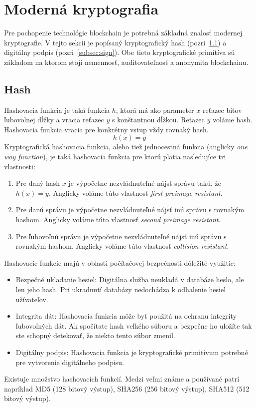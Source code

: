 \section{Moderná kryptografia}\label{sec:crypto}
Pre pochopenie technológie blockchain je potrebná základná znalosť modernej kryptografie. V tejto sekcii je popísaný kryptografický hash (pozri~\ref{subsec:hash}) a digitálny podpis (pozri~\ref{subsec:sign}). Obe tieto kryptografické primitíva sú základom na ktorom stojí nemennosť, auditovateľnosť a anonymita blockchainu.

\subsection{Hash}\label{subsec:hash}
Hashovacia funkcia je taká funkcia $h$, ktorá má ako parameter $x$ reťazec bitov ľubovolnej dĺžky a vracia reťazec $y$ s konštantnou dĺžkou. Reťazec $y$ voláme hash. Hashovacia funkcia vracia pre konkrétny vstup vždy rovnaký hash.
$$ h(x) = y $$
Kryptografická hashovacia funkcia, alebo tiež jednocestná funkcia (anglicky \textit{one way function}), je taká hashovacia funkcia pre ktorú platia nasledujíce tri vlastnosti:
\begin{enumerate}
	\item Pre daný hash $x$ je výpočetne nezvládnuteľné nájsť správu takú, že $ h(x) = y $. Anglicky voláme túto vlastnosť \textit{first preimage resistant}.
	\item Pre danú správu je výpočetne nezvládnuteľné nájsť inú správu s rovnakým hashom. Anglicky voláme túto vlastnosť \textit{second preimage resistant}.
	\item Pre ľubovoľnú správu je výpočetne nezvládnuteľné nájsť inú správu s rovnakým hashom. Anglicky voláme túto vlastnosť \textit{collision resistant}.
\end{enumerate}

Hashovacie funkcie majú v oblasti počítačovej bezpečnosti dôležité využitie:
\begin{itemize}
	\item Bezpečné ukladanie hesiel: Digitálna služba neukladá v databáze heslo, ale len jeho hash. Pri ukradnutí databázy nedochádza k odhalenie hesiel užívateľov.
	\item Integrita dát: Hashovacia funkcia môže byť použitá na ochranu integrity ľubovoľných dát. Ak spočítate hash veľkého súboru a bezpečne ho uložíte tak ste schopný detekovať, že niekto tento súbor zmenil.
	\item Digitálny podpis: Hashovacia funkcia je kryptografické primitívum potrebné pre vytvorenie digitálneho podpisu.
\end{itemize}
Existuje množstvo hashovacích funkcií. Medzi veľmi známe a používané patrí napríklad MD5 (128 bitový výstup), SHA256 (256 bitový výstup), SHA512 (512 bitový výstup).~\cite{cryptoHandbook, nigelSmartCrypto}

